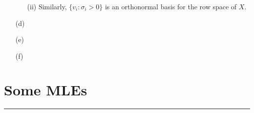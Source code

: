 \documentclass{article}
\begin{document}
\begin{itemize}
\begin{itemize}
\begin{answer}
                    \end{answer}

                \item [(ii)] Similarly, $\{v_{i} : \sigma_{i} > 0\}$ is an orthonormal basis for the row space of $X$.
            \end{itemize}

        \item [(d)]

        \item [(e)]

        \item [(f)]
    \end{itemize}

\newpage
\section*{Some MLEs}
\hrule
\end{document}
